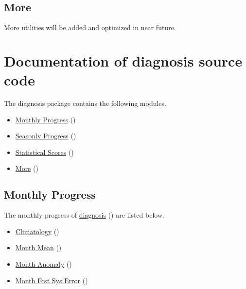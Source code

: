 \documentclass[letterpaper,10pt,english]{sphinxmanual}
\begin{document}
\section{More}
\label{diagnosisutils:more}
More utilities will be added and optimized in near future.


\chapter{Documentation of \textbf{diagnosis} source code}
\label{diagnosis:documentation-of-diagnosis-source-code}\label{diagnosis::doc}\label{diagnosis:diagnosis}
The diagnosis package contains the following modules.
\begin{itemize}
\item {} 
{\hyperref[diagnosis:monthly-progress]{Monthly Progress}} ()

\item {} 
{\hyperref[diagnosis:seasonly-progress]{Seasonly Progress}} ()

\item {} 
{\hyperref[diagnosis:statistical-scores]{Statistical Scores}} ()

\item {} 
{\hyperref[diagnosis:more]{More}} ()

\end{itemize}


\section{Monthly Progress}
\label{diagnosis:monthly-progress}
The monthly progress of {\hyperref[diagnosis:diagnosis]{diagnosis}} () are listed below.
\begin{itemize}
\item {} 
{\hyperref[diagnosis:climatology]{Climatology}} ()

\item {} 
{\hyperref[diagnosis:month-mean]{Month Mean}} ()

\item {} 
{\hyperref[diagnosis:month-anomaly]{Month Anomaly}} ()

\item {} 
{\hyperref[diagnosis:month-fcst-sys-error]{Month Fcst Sys Error}} ()

\end{itemize}
\end{document}
